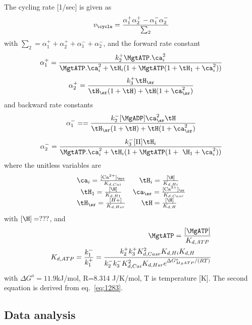 The cycling rate [1/sec] is given as
\begin{equation}
  \label{eq:1273}
  v_\cycle = \frac{\alpha^+_1\alpha^+_2-\alpha^-_1\alpha^-_2}{\sum_2}
\end{equation}
with $\sum_2 = \alpha^+_1+\alpha^+_2+\alpha^-_1+\alpha^-_2$, and the
forward rate constant
\begin{equation}
  \label{eq:1268}
  \alpha_1^+ = \frac{k^+_2 \MgtATP.\ca_i^2}{\MgtATP.\ca_i^2 + \tH_i(1+\MgtATP(1+\tH_1+\ca_i^2))}
\end{equation}
\begin{equation}
  \label{eq:1269}
  \alpha_2^+ = \frac{k^+_3\tH_\sr}{\tH_\sr(1+\tH)+\tH(1+\ca^2_\sr)}
\end{equation}
and backward rate constants
\begin{equation}
  \label{eq:1270}
  \alpha^-_1 =  = \frac{k^-_2 [\MgADP]\ca^2_\sr\tH}{\tH_\sr(1+\tH)+\tH(1+\ca_\sr^2)}
\end{equation}
\begin{equation}
  \label{eq:1271}
  \alpha_2^-=\frac{k^-_3[\Pi]\tH_i}{\MgtATP.\ca^2_i + \tH_i(1+\MgtATP(1+~\H_1+\ca^2_i))}
\end{equation}
where the unitless variables are
\begin{equation}
  \label{eq:1284}
  \begin{array}{cc}
    \ca_i = \frac{[\Ca]_\myo}{K_{d,Cai}} &
    \tH_i = \frac{[\H]}{K_{d,Hi}} \\
    \tH_1=\frac{[\H]}{K_{d,H1}} &
    \ca_\sr = \frac{[\Ca]_\sr}{K_{d,Casr}} \\
    \tH_\sr = \frac{[H+]}{K_{d,Hsr}} &
    \tH = \frac{[\H]}{K_{d,H}}
  \end{array}
\end{equation}
with $[\H]=???$, and
\begin{equation}
  \label{eq:1272}
  \begin{split}
    \MgtATP = \frac{[\MgATP]}{K_{d,ATP}} \\
    K_{d,ATP} = \frac{k^-_1}{k^+_1} =
    \frac{k^+_2k^+_3K^2_{d,Casr}K_{d,Hi}K_{d,H}}{k^-_2k^-_3K^2_{d,Cai}K_{d,Hsr}e^{\Delta G^o_{MgATP}/(RT)}}
  \end{split}
\end{equation}
with $\Delta G^o=11.9$kJ/mol, R=8.314 J/K/mol, T is temperature
[K]. The second equation is derived from eq.~\eqref{eq:1283}.

\subsection{Data analysis}
\label{sec:data-analysis-2}

